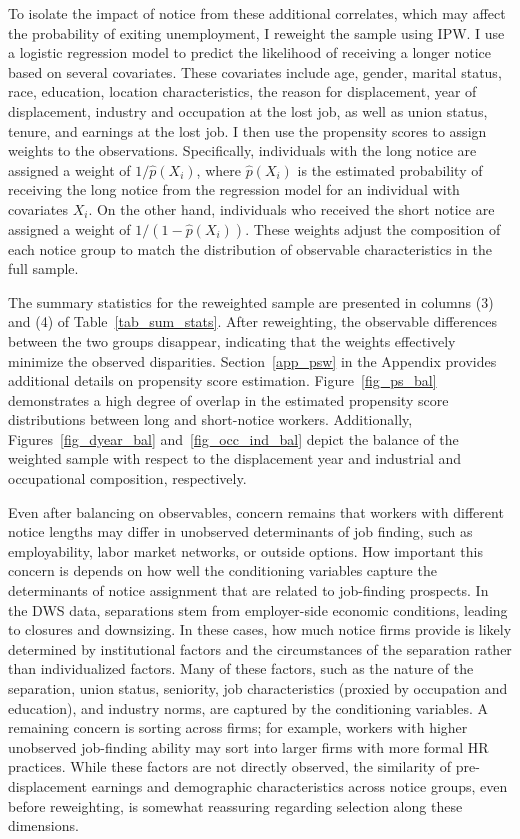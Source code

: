 \documentclass{div}
\begin{document}
To isolate the impact of notice from these additional correlates, which may affect the probability of exiting unemployment, I reweight the sample using IPW. I use a logistic regression model to predict the likelihood of receiving a longer notice based on several covariates. These covariates include age, gender, marital status, race, education, location characteristics, the reason for displacement, year of displacement, industry and occupation at the lost job, as well as union status, tenure, and earnings at the lost job. I then use the propensity scores to assign weights to the observations. Specifically, individuals with the long notice are assigned a weight of $1/\hat{p}(X_i)$, where $\hat{p}(X_i)$ is the estimated probability of receiving the long notice from the regression model for an individual with covariates $X_i$. On the other hand, individuals who received the short notice are assigned a weight of $1/(1-\hat{p}(X_i))$. These weights adjust the composition of each notice group to match the distribution of observable characteristics in the full sample.

The summary statistics for the reweighted sample are presented in columns (3) and (4) of Table~\ref{tab_sum_stats}. After reweighting, the observable differences between the two groups disappear, indicating that the weights effectively minimize the observed disparities. Section~\ref{app_psw} in the  Appendix provides additional details on propensity score estimation. Figure~\ref{fig_ps_bal} demonstrates a high degree of overlap in the estimated propensity score distributions between long and short-notice workers. Additionally, Figures~\ref{fig_dyear_bal} and~\ref{fig_occ_ind_bal} depict the balance of the weighted sample with respect to the displacement year and industrial and occupational composition, respectively.

Even after balancing on observables, concern remains that workers with different notice lengths may differ in unobserved determinants of job finding, such as employability, labor market networks, or outside options. How important this concern is depends on how well the conditioning variables capture the determinants of notice assignment that are related to job-finding prospects. In the DWS data, separations stem from employer-side economic conditions, leading to closures and downsizing. In these cases, how much notice firms provide is likely determined by institutional factors and the circumstances of the separation rather than individualized factors.  Many of these factors, such as the nature of the separation, union status, seniority, job characteristics (proxied by occupation and education), and industry norms, are captured by the conditioning variables. A remaining concern is sorting across firms; for example, workers with higher unobserved job-finding ability may sort into larger firms with more formal HR practices. While these factors are not directly observed, the similarity of pre-displacement earnings and demographic characteristics across notice groups, even before reweighting, is somewhat reassuring regarding selection along these dimensions.
\end{document}
